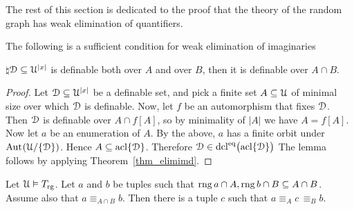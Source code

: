 The rest of this section is dedicated to the proof that the theory of the random graph has weak elimination of quantifiers.

\begin{lemma}\label{lem_suff_wei}
  The following is a sufficient condition for weak elimination of imaginaries

  $\natural$\qquad $\EuScript D\subseteq\EuScript U^{|x|}$ is definable both over $A$ and over $B$, then it is definable over $A\cap B$.
\end{lemma}

\begin{proof}
  Let $\EuScript D\subseteq\EuScript U^{|x|}$ be a definable set, and pick a finite set $A\subseteq\EuScript U$ of minimal size over which $\EuScript D$ is definable. 
  Now, let $f$ be an automorphism that fixes $\EuScript D$. Then $\EuScript D$ is definable over $A\cap f[A]$, so by minimality of $|A|$ we have $A= f[A]$. 
  Now let $a$ be an enumeration of $A$.
  By the above, $a$ has a finite orbit under ${\rm Aut\kern.15ex}(\EuScript U/\{\EuScript D\})$.
  Hence $A\subseteq{\rm acl}\{\EuScript D\}$.
  Therefore $\EuScript D\in{\rm dcl}^{{\rm eq}}\big({\rm acl}\{\EuScript D\}\big)$
  The lemma follows by applying Theorem~\ref{thm_elimimd}.
\end{proof}

\begin{lemma}\label{lem_type_amalgamation}
  Let $\EuScript U\vDash T_{\rm rg}$.
  Let $a$ and $b$ be tuples such that $\mathop{\rm rng} a\cap A,\mathop{\rm rng} b\cap B\subseteq A\cap B$.
  Assume also that $a\equiv_{A\cap B}b$.
  Then there is a tuple $c$ such that $a\equiv_A c\,\equiv_B b$.
\end{lemma}

